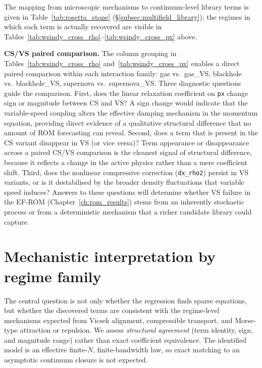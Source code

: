 The mapping from microscopic mechanisms to continuum-level library terms
is given in Table~\ref{tab:rosetta_stone}
(\S\ref{subsec:multifield_library}); the regimes in which each term is
actually recovered are visible in
Tables~\ref{tab:wsindy_cross_rho}--\ref{tab:wsindy_cross_px} above.

\noindent\textbf{CS/VS paired comparison.}
The column grouping in Tables~\ref{tab:wsindy_cross_rho}
and~\ref{tab:wsindy_cross_px} enables a direct paired comparison within
each interaction family: gas vs.\ gas\_VS, blackhole vs.\ blackhole\_VS,
supernova vs.\ supernova\_VS\@.  Three diagnostic questions guide the
comparison.  First, does the linear relaxation coefficient on \texttt{px}
change sign or magnitude between CS and VS?  A sign change would indicate
that the variable-speed coupling alters the effective damping mechanism in
the momentum equation, providing direct evidence of a qualitative structural
difference that no amount of ROM forecasting can reveal.  Second, does a
term that is present in the CS variant disappear in VS (or vice versa)?
Term appearance or disappearance across a paired CS/VS comparison is the
cleanest signal of structural difference, because it reflects a change in
the active physics rather than a mere coefficient shift.  Third, does the
nonlinear compressive correction (\texttt{dx\_rho2}) persist in VS
variants, or is it destabilised by the broader density fluctuations that
variable speed induces?  Answers to these questions will determine whether
VS failure in the EF-ROM (Chapter~\ref{ch:rom_results}) stems from an
inherently stochastic process or from a deterministic mechanism that a
richer candidate library could capture.

\section{Mechanistic interpretation by regime family}
\label{sec:continuum_comparison}

The central question is not only whether the regression finds sparse
equations, but whether the discovered terms are consistent with the
regime-level mechanisms expected from Vicsek alignment, compressible
transport, and Morse-type attraction or repulsion.  We assess
\emph{structural agreement} (term identity, sign, and magnitude
range) rather than exact coefficient equivalence.  The identified model
is an effective finite-$N$, finite-bandwidth law, so exact matching to
an asymptotic continuum closure is not expected.

